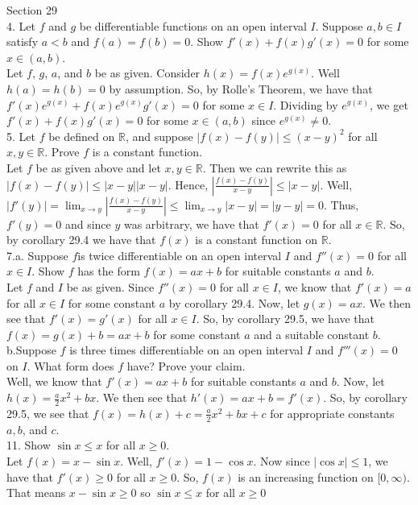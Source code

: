 \documentclass[12pt]{article}
\begin{document}
Section 29\\

4. Let $f$ and $g$ be differentiable functions on an open interval $I$. Suppose $a,b\in I$ satisfy $a<b$ and $f(a)=f(b)=0$. Show $f'(x)+f(x)g'(x)=0$ for some $x\in(a, b)$.\\
Let $f$, $g$, $a$, and $b$ be as given. Consider $h(x)=f(x)e^{g(x)}$. Well $h(a)=h(b)=0$ by assumption. So, by Rolle's Theorem, we have that $f'(x)e^{g(x)}+f(x)e^{g(x)}g'(x)=0$ for some $x\in I$. Dividing by $e^{g(x)}$, we get $f'(x)+f(x)g'(x)=0$ for some $x\in(a, b)$ since $e^{g(x)}\neq0$.\\[20pt]

5. Let $f$ be defined on $\mathbb{R}$, and suppose $|f(x)-f(y)|\leq(x-y)^2$ for all $x,y\in\mathbb{R}$. Prove $f$ is a constant function.\\
Let $f$ be as given above and let $x,y\in\mathbb{R}$. Then we can rewrite this as $|f(x)-f(y)|\leq|x-y||x-y|$. Hence, $|\frac{f(x)-f(y)}{x-y}|\leq|x-y|$. Well, $|f'(y)|=\lim_{x\rightarrow y}|\frac{f(x)-f(y)}{x-y}|\leq\lim_{x\rightarrow y}|x-y|=|y-y|=0$. Thus, $f'(y)=0$ and since $y$ was arbitrary, we have that $f'(x)=0$ for all $x\in\mathbb{R}$. So, by corollary 29.4 we have that $f(x)$ is a constant function on $\mathbb{R}$.\\[20pt]

7.a. Suppose $f$is twice differentiable on an open interval $I$ and $f''(x)=0$ for all $x\in I$. Show $f$ has the form $f(x)=ax+b$ for suitable constants $a$ and $b$.\\
Let $f$ and $I$ be as given. Since $f''(x)=0$ for all $x\in I$, we know that $f'(x)=a$ for all $x\in I$ for some constant $a$ by corollary 29.4. Now, let $g(x)=ax$. We then see that $f'(x)=g'(x)$ for all $x\in I$. So, by corollary 29.5, we have that $f(x)=g(x)+b=ax+b$ for some constant $a$ and a suitable constant $b$.\\
b.Suppose $f$ is three times differentiable on an open interval $I$ and $f'''(x)=0$ on $I$. What form does $f$ have? Prove your claim.\\
Well, we know that $f'(x)=ax+b$ for suitable constants $a$ and $b$. Now, let $h(x)=\frac{a}{2}x^2+bx$. We then see that $h'(x)=ax+b=f'(x)$. So, by corollary 29.5, we see that $f(x)=h(x)+c=\frac{a}{2}x^2+bx+c$ for appropriate constants $a ,b$, and $c$.\\[20pt]

11. Show $\sin x\leq x$ for all $x\geq0$.\\
Let $f(x)=x-\sin x$. Well, $f'(x)=1-\cos x$. Now since $|\cos x|\leq1$, we have that $f'(x)\geq0$ for all $x\geq0$. %
So, $f(x)$ is an increasing function on $[0,\infty)$. That means $x-\sin x\geq0$ so $\sin x\leq x$ for all $x\geq0$\\[20pt]
\end{document}
